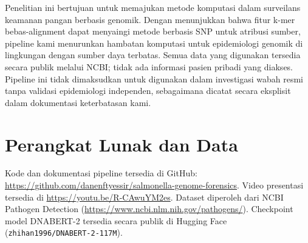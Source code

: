 \documentclass{article}
\begin{document}
Penelitian ini bertujuan untuk memajukan metode komputasi dalam surveilans
keamanan pangan berbasis genomik. Dengan menunjukkan bahwa fitur k-mer
bebas-alignment dapat menyaingi metode berbasis SNP untuk atribusi sumber,
pipeline kami menurunkan hambatan komputasi untuk epidemiologi genomik di
lingkungan dengan sumber daya terbatas. Semua data yang digunakan tersedia
secara publik melalui NCBI; tidak ada informasi pasien pribadi yang diakses.
Pipeline ini tidak dimaksudkan untuk digunakan dalam investigasi wabah resmi
tanpa validasi epidemiologi independen, sebagaimana dicatat secara eksplisit
dalam dokumentasi keterbatasan kami.

\section*{Perangkat Lunak dan Data}

Kode dan dokumentasi pipeline tersedia di GitHub:
\url{https://github.com/danenftyessir/salmonella-genome-forensics}.
Video presentasi tersedia di \url{https://youtu.be/R-CAwuYM2es}.
Dataset diperoleh dari NCBI Pathogen Detection
(\url{https://www.ncbi.nlm.nih.gov/pathogens/}).
Checkpoint model DNABERT-2 tersedia secara publik di Hugging Face
(\texttt{zhihan1996/DNABERT-2-117M}).




\end{document}
